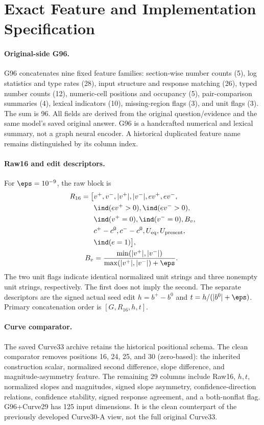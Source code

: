 \clearpage
\appendix
\section{Exact Feature and Implementation Specification}
\label{app:features}
\paragraph{Original-side G96.}
G96 concatenates nine fixed feature families: section-wise number counts (5), log statistics and type rates (28), input structure and response matching (26), typed number counts (12), numeric-cell positions and occupancy (5), pair-comparison summaries (4), lexical indicators (10), missing-region flags (3), and unit flags (3). The sum is 96. All fields are derived from the original question/evidence and the same model's saved original answer. G96 is a handcrafted numerical and lexical summary, not a graph neural encoder. A historical duplicated feature name remains distinguished by its column index.

\paragraph{Raw16 and edit descriptors.}
For $\eps=10^{-9}$, the raw block is
\begin{align}
 R_{16}=\big[&v^+,v^-,|v^+|,|v^-|,ev^+,ev^-,\nonumber\\
 &\ind(ev^+>0),\ind(ev^->0),\nonumber\\
 &\ind(v^+=0),\ind(v^-=0),B_v,\nonumber\\
 &c^+-c^0,c^--c^0,U_{\mathrm{eq}},U_{\mathrm{present}},\nonumber\\
 &\ind(e=1)\big],\\
 B_v&=\frac{\min(|v^+|,|v^-|)}{\max(|v^+|,|v^-|)+\eps}.
\end{align}
The two unit flags indicate identical normalized unit strings and three nonempty unit strings, respectively. The first does not imply the second. The separate descriptors are the signed actual seed edit $h=b^+-b^0$ and $t=h/(|b^0|+\eps)$. Primary concatenation order is $[G,R_{16},h,t]$.

\paragraph{Curve comparator.}
The saved Curve33 archive retains the historical positional schema. The clean comparator removes positions 16, 24, 25, and 30 (zero-based): the inherited construction scalar, normalized second difference, slope difference, and magnitude-asymmetry feature. The remaining 29 columns include Raw16, $h,t$, normalized slopes and magnitudes, signed slope asymmetry, confidence-direction relations, confidence stability, signed response agreement, and a both-nonflat flag. G96+Curve29 has 125 input dimensions. It is the clean counterpart of the previously developed Curve30-A view, not the full original Curve33.

